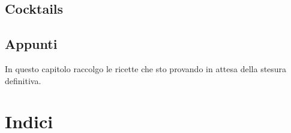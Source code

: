 \documentclass{report}
\begin{document}
\chapter{Cocktails}



\chapter{Appunti}
In questo capitolo raccolgo le ricette che sto provando in attesa della stesura definitiva.








\newpage
\part{Indici}
\printindex
\end{document}
